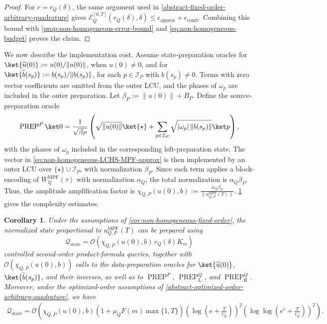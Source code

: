 \documentclass[10pt,reqno]{article}
\numberwithin{equation}{section}
\theoremstyle{plain}
\newtheorem{cor}[thm]{Corollary}
\theoremstyle{definition}
\begin{document}
\begin{proof}
For \(r=r_Q(\delta)\), the same argument used in \cref{abstract-fixed-order-arbitrary-quadrature} gives \(\mathcal E_Q^{[0,T]}(r_Q(\delta),\delta)\leq \epsilon_{\operatorname{approx}}+\epsilon_{\operatorname{comb}}\). Combining this bound with \cref{prop:non-homogeneous-error-bound} and \cref{eq:non-homogeneous-budget} proves the claim.
\end{proof}

We now describe the implementation cost. Assume state-preparation oracles for \(\ket{\widetilde u(0)}:=u(0)/\|u(0)\|\), when \(u(0)\neq0\), and for \(\ket{\widetilde b(s_p)}:=b(s_p)/\|b(s_p)\|\), for each \(p\in\mathcal I_P\) with \(b(s_p)\neq0\). Terms with zero vector coefficients are omitted from the outer LCU, and the phases of \(\omega_p\) are included in the outer preparation. Let \(\beta_P:=\|u(0)\|+B_P\). Define the source-preparation oracle
\begin{equation}
\operatorname{PREP}^{P}\ket 0 = \frac{1}{\sqrt{\beta_P}}\left(\sqrt{\|u(0)\|}\ket{\star}+\sum_{p\in\mathcal I_P}\sqrt{|\omega_p|\,\|b(s_p)\|}\ket p\right),
\end{equation}
with the phases of \(\omega_p\) included in the corresponding left-preparation state. 
The vector in \cref{eq:non-homogeneous-LCHS-MPF-approx} is then implemented by an outer LCU over \(\{\star\}\cup\mathcal I_P\), with normalization \(\beta_P\). Since each term applies a block-encoding of \(W_Q^{\operatorname{MPF}}(\tau)\) with normalization \(\alpha_Q\), the total normalization is \(\alpha_Q\beta_P\). Thus, the amplitude amplification factor is $\chi_{Q,P}(u(0),b):=\frac{\alpha_Q\beta_P}{\|u_{Q,P}^{\operatorname{MPF}}(T)\|}$. \cref{cor:non-homogeneous-complexity} gives the complexity estimates.

\begin{cor}\label{cor:non-homogeneous-complexity}
Under the assumptions of \cref{cor:non-homogeneous-fixed-order}, the normalized state proportional to \(u_{Q,P}^{\operatorname{MPF}}(T)\) can be prepared using
\begin{equation}
\mathcal Q_{\operatorname{state}}=\mathcal O\!\left(\chi_{Q,P}(u(0),b)\,r_Q(\delta)K_m\right)
\end{equation}
controlled second-order product-formula queries, together with \(\mathcal O(\chi_{Q,P}(u(0),b))\) calls to the data-preparation oracles for \(\ket{\widetilde u(0)}\), \(\ket{\widetilde b(s_p)}\), and their inverses, as well as to \(\operatorname{PREP}^{P}\), \(\operatorname{PREP}_{\operatorname L}^{Q}\), and \(\operatorname{PREP}_{\operatorname R}^{Q}\). Moreover, under the optimized-order assumptions of \cref{abstract-optimized-order-arbitrary-quadrature}, we have
\begin{align}
\mathcal Q_{\operatorname{state}} = \mathcal O\left(\chi_{Q,P}(u(0),b)\left(1+\mu_QF(m)\max\{1,T\}\right)\left(\log\left(e+\frac{T}{\epsilon_Q}\right)\right)^2\left(\log\log\left(e^e+\frac{T}{\epsilon_Q}\right)\right)^2\right).
\label{eq:non-homogeneous-optimized-complexity}
\end{align}
\end{cor}
\end{document}
